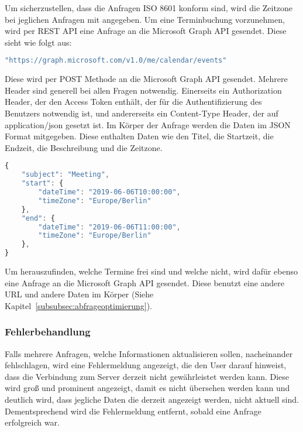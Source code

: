 \newline
Um sicherzustellen, dass die Anfragen ISO 8601 konform sind, wird die Zeitzone bei jeglichen Anfragen mit angegeben.
Um eine Terminbuchung vorzunehmen, wird per REST API eine Anfrage an die Microsoft Graph API gesendet.
\newline
Diese sieht wie folgt aus:
\newline
\begin{lstlisting}[language=JavaScript,label={lst:JavaScript REST API Anfrage}]
"https://graph.microsoft.com/v1.0/me/calendar/events"
\end{lstlisting}
Diese wird per POST Methode an die Microsoft Graph API gesendet.
Mehrere Header sind generell bei allen Fragen notwendig.
Einerseits ein Authorization Header, der den Access Token enthält, der für die Authentifizierung des Benutzers notwendig ist, und andererseits ein Content-Type Header, der auf application/json gesetzt ist.
\newline
Im Körper der Anfrage werden die Daten im JSON Format mitgegeben.
Diese enthalten Daten wie den Titel, die Startzeit, die Endzeit, die Beschreibung und die Zeitzone.
\newline
\begin{lstlisting}[language=JavaScript,label={lst:JavaScript REST API Körper}]
{
    "subject": "Meeting",
    "start": {
        "dateTime": "2019-06-06T10:00:00",
        "timeZone": "Europe/Berlin"
    },
    "end": {
        "dateTime": "2019-06-06T11:00:00",
        "timeZone": "Europe/Berlin"
    },
}
    \end{lstlisting}
\newline
\newline
Um herauszufinden, welche Termine frei sind und welche nicht, wird dafür ebenso eine Anfrage an die Microsoft Graph API gesendet.
Diese benutzt eine andere URL und andere Daten im Körper (Siehe Kapitel~\ref{subsubsec:abfrageoptimierung}).
\subsubsection{Fehlerbehandlung}\label{subsubsec:fehlerbehandlung-REST}
Falls mehrere Anfragen, welche Informationen aktualisieren sollen, nacheinander fehlschlagen, wird eine Fehlermeldung angezeigt, die den User darauf hinweist, dass die Verbindung zum Server derzeit nicht gewährleistet werden kann.
Diese wird groß und prominent angezeigt, damit es nicht übersehen werden kann und deutlich wird, dass jegliche Daten die derzeit angezeigt werden, nicht aktuell sind.
Dementsprechend wird die Fehlermeldung entfernt, sobald eine Anfrage erfolgreich war.
\newline
\newline
